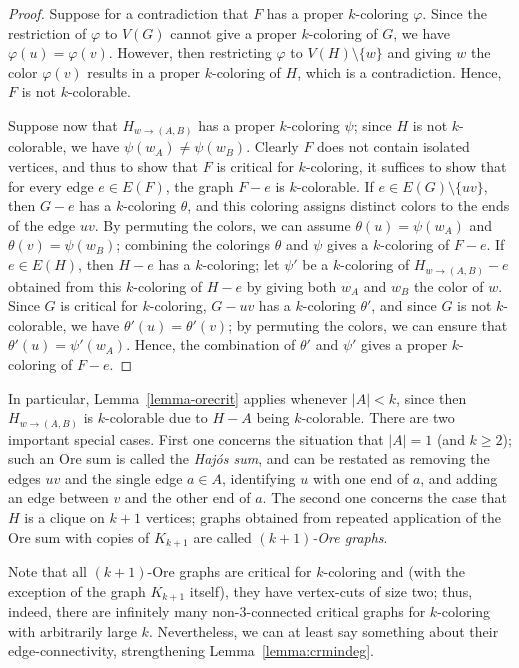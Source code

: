 \documentclass[12pt,twoside,openright,a4paper]{book}
\begin{document}
\begin{proof}
Suppose for a contradiction that $F$ has a proper $k$-coloring $\varphi$.  Since the restriction of $\varphi$ to $V(G)$ cannot give a proper $k$-coloring of $G$,
we have $\varphi(u)=\varphi(v)$.  However, then restricting $\varphi$ to $V(H)\setminus\{w\}$ and giving $w$ the color $\varphi(v)$ results in a proper $k$-coloring of $H$,
which is a contradiction.  Hence, $F$ is not $k$-colorable.

Suppose now that $H_{w\to(A,B)}$ has a proper $k$-coloring $\psi$; since $H$ is not $k$-colorable, we have $\psi(w_A)\neq\psi(w_B)$.
Clearly $F$ does not contain isolated vertices, and thus to show that $F$ is critical for $k$-coloring, it suffices to show that for every edge $e\in E(F)$, the graph $F-e$ is $k$-colorable.
If $e\in E(G)\setminus\{uv\}$, then $G-e$ has a $k$-coloring $\theta$, and this coloring assigns distinct colors to the ends of the edge $uv$.
By permuting the colors, we can assume $\theta(u)=\psi(w_A)$ and $\theta(v)=\psi(w_B)$;
combining the colorings $\theta$ and $\psi$ gives a $k$-coloring of $F-e$.  If $e\in E(H)$, then $H-e$ has a $k$-coloring; let $\psi'$ be a $k$-coloring of $H_{w\to(A,B)}-e$ obtained from this
$k$-coloring of $H-e$ by giving both $w_A$ and $w_B$ the color of $w$.  Since $G$ is critical for $k$-coloring, $G-uv$ has a $k$-coloring $\theta'$, and since $G$ is not $k$-colorable,
we have $\theta'(u)=\theta'(v)$; by permuting the colors, we can ensure that $\theta'(u)=\psi'(w_A)$.  Hence, the combination of $\theta'$ and $\psi'$ gives a proper $k$-coloring
of $F-e$.
\end{proof}
In particular, Lemma~\ref{lemma-orecrit} applies whenever $|A|<k$, since then $H_{w\to(A,B)}$ is $k$-colorable due to $H-A$ being $k$-colorable.
There are two important special cases.  First one concerns the situation that $|A|=1$ (and $k\ge 2$); such an Ore sum is called the \emph{Haj\'os sum},
and can be restated as removing the edges $uv$ and the single edge $a\in A$, identifying $u$ with one end of $a$, and adding an edge between $v$ and the other end of $a$.
The second one concerns the case that $H$ is a clique on $k+1$ vertices; graphs obtained from repeated application of the Ore sum with copies of $K_{k+1}$ are called \emph{$(k+1)$-Ore graphs}.

Note that all $(k+1)$-Ore graphs are critical for $k$-coloring and (with the exception of the graph $K_{k+1}$ itself), they have vertex-cuts of size two; thus, indeed,
there are infinitely many non-$3$-connected critical graphs for $k$-coloring with arbitrarily large $k$.  Nevertheless, we can at least say something about their edge-connectivity,
strengthening Lemma~\ref{lemma:crmindeg}.
\end{document}
